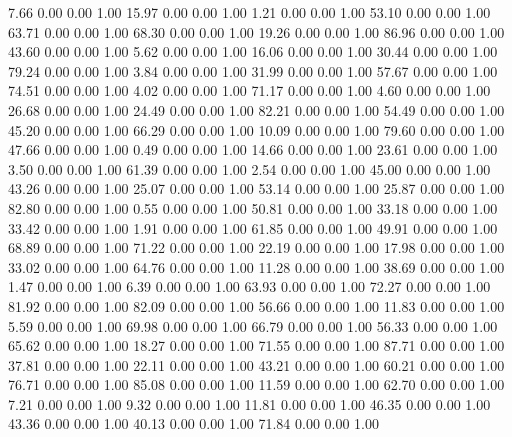     7.66   0.00   0.00   1.00
   15.97   0.00   0.00   1.00
    1.21   0.00   0.00   1.00
   53.10   0.00   0.00   1.00
   63.71   0.00   0.00   1.00
   68.30   0.00   0.00   1.00
   19.26   0.00   0.00   1.00
   86.96   0.00   0.00   1.00
   43.60   0.00   0.00   1.00
    5.62   0.00   0.00   1.00
   16.06   0.00   0.00   1.00
   30.44   0.00   0.00   1.00
   79.24   0.00   0.00   1.00
    3.84   0.00   0.00   1.00
   31.99   0.00   0.00   1.00
   57.67   0.00   0.00   1.00
   74.51   0.00   0.00   1.00
    4.02   0.00   0.00   1.00
   71.17   0.00   0.00   1.00
    4.60   0.00   0.00   1.00
   26.68   0.00   0.00   1.00
   24.49   0.00   0.00   1.00
   82.21   0.00   0.00   1.00
   54.49   0.00   0.00   1.00
   45.20   0.00   0.00   1.00
   66.29   0.00   0.00   1.00
   10.09   0.00   0.00   1.00
   79.60   0.00   0.00   1.00
   47.66   0.00   0.00   1.00
    0.49   0.00   0.00   1.00
   14.66   0.00   0.00   1.00
   23.61   0.00   0.00   1.00
    3.50   0.00   0.00   1.00
   61.39   0.00   0.00   1.00
    2.54   0.00   0.00   1.00
   45.00   0.00   0.00   1.00
   43.26   0.00   0.00   1.00
   25.07   0.00   0.00   1.00
   53.14   0.00   0.00   1.00
   25.87   0.00   0.00   1.00
   82.80   0.00   0.00   1.00
    0.55   0.00   0.00   1.00
   50.81   0.00   0.00   1.00
   33.18   0.00   0.00   1.00
   33.42   0.00   0.00   1.00
    1.91   0.00   0.00   1.00
   61.85   0.00   0.00   1.00
   49.91   0.00   0.00   1.00
   68.89   0.00   0.00   1.00
   71.22   0.00   0.00   1.00
   22.19   0.00   0.00   1.00
   17.98   0.00   0.00   1.00
   33.02   0.00   0.00   1.00
   64.76   0.00   0.00   1.00
   11.28   0.00   0.00   1.00
   38.69   0.00   0.00   1.00
    1.47   0.00   0.00   1.00
    6.39   0.00   0.00   1.00
   63.93   0.00   0.00   1.00
   72.27   0.00   0.00   1.00
   81.92   0.00   0.00   1.00
   82.09   0.00   0.00   1.00
   56.66   0.00   0.00   1.00
   11.83   0.00   0.00   1.00
    5.59   0.00   0.00   1.00
   69.98   0.00   0.00   1.00
   66.79   0.00   0.00   1.00
   56.33   0.00   0.00   1.00
   65.62   0.00   0.00   1.00
   18.27   0.00   0.00   1.00
   71.55   0.00   0.00   1.00
   87.71   0.00   0.00   1.00
   37.81   0.00   0.00   1.00
   22.11   0.00   0.00   1.00
   43.21   0.00   0.00   1.00
   60.21   0.00   0.00   1.00
   76.71   0.00   0.00   1.00
   85.08   0.00   0.00   1.00
   11.59   0.00   0.00   1.00
   62.70   0.00   0.00   1.00
    7.21   0.00   0.00   1.00
    9.32   0.00   0.00   1.00
   11.81   0.00   0.00   1.00
   46.35   0.00   0.00   1.00
   43.36   0.00   0.00   1.00
   40.13   0.00   0.00   1.00
   71.84   0.00   0.00   1.00
